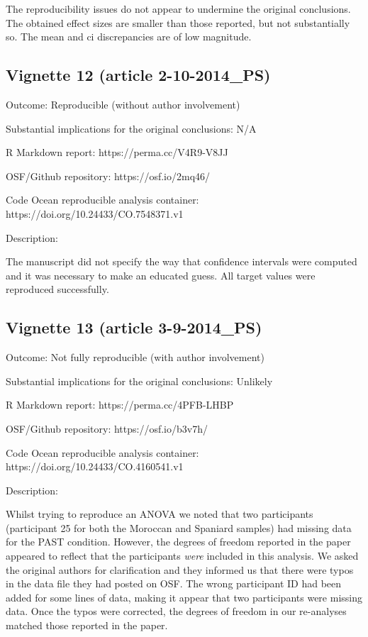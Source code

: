 \documentclass[english,,man,floatsintext]{apa6}
\begin{document}
\begin{appendix}
The reproducibility issues do not appear to undermine the original
conclusions. The obtained effect sizes are smaller than those reported,
but not substantially so. The mean and ci discrepancies are of low
magnitude.

\hypertarget{vignette-12-article-2-10-2014_ps}{%
\subsection{Vignette 12 (article
2-10-2014\_PS)}\label{vignette-12-article-2-10-2014_ps}}

Outcome: Reproducible (without author involvement)

Substantial implications for the original conclusions: N/A

R Markdown report: https://perma.cc/V4R9-V8JJ

OSF/Github repository: https://osf.io/2mq46/

Code Ocean reproducible analysis container:
https://doi.org/10.24433/CO.7548371.v1

Description:

The manuscript did not specify the way that confidence intervals were
computed and it was necessary to make an educated guess. All target
values were reproduced successfully.

\hypertarget{vignette-13-article-3-9-2014_ps}{%
\subsection{Vignette 13 (article
3-9-2014\_PS)}\label{vignette-13-article-3-9-2014_ps}}

Outcome: Not fully reproducible (with author involvement)

Substantial implications for the original conclusions: Unlikely

R Markdown report: https://perma.cc/4PFB-LHBP

OSF/Github repository: https://osf.io/b3v7h/

Code Ocean reproducible analysis container:
https://doi.org/10.24433/CO.4160541.v1

Description:

Whilst trying to reproduce an ANOVA we noted that two participants
(participant 25 for both the Moroccan and Spaniard samples) had missing
data for the PAST condition. However, the degrees of freedom reported in
the paper appeared to reflect that the participants \emph{were} included
in this analysis. We asked the original authors for clarification and
they informed us that there were typos in the data file they had posted
on OSF. The wrong participant ID had been added for some lines of data,
making it appear that two participants were missing data. Once the typos
were corrected, the degrees of freedom in our re-analyses matched those
reported in the paper.


\end{appendix}
\end{document}
